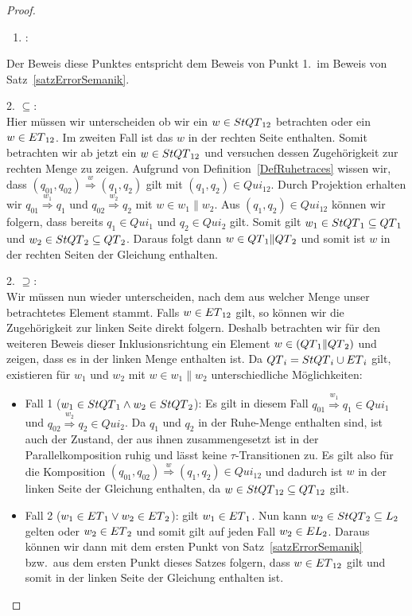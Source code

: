 \begin{proof}
  ~
  \begin{enumerate}
    \item \hspace{-0.2cm}:
  \end{enumerate}
  \vspace{-0.3cm}
  Der Beweis diese Punktes entspricht dem Beweis von Punkt 1.\ im Beweis von
  Satz~\ref{satzErrorSemanik}.

  2. \glqq $\subseteq$\grqq :\\
  Hier müssen wir unterscheiden ob wir ein $w\in StQT{}_{12}$ betrachten oder
  ein $w\in ET{}_{12}$. Im zweiten Fall ist das $w$ in der rechten Seite
  enthalten. Somit betrachten wir ab jetzt ein
  $w\in StQT{}_{12}$ und versuchen dessen Zugehörigkeit zur rechten Menge zu
  zeigen. Aufgrund von Definition~\ref{DefRuhetraces} wissen wir, dass
  $(q_{01},q_{02}) \overset{w}{\Rightarrow} (q_1,q_2)$ gilt mit $(q_1,q_2)\in
  Qui_{12}$. Durch Projektion erhalten wir $q_{01} \overset{w_1}{\Rightarrow}
  q_1$ und $q_{02} \overset{w_2}{\Rightarrow} q_2$ mit $w\in w_1\|w_2$. Aus
  $(q_1,q_2)\in Qui_{12}$ können wir folgern, dass bereits $q_1\in Qui_1$ und
  $q_2\in Qui_2$ gilt. Somit gilt $w_1\in StQT{}_1\subseteq QT{}_1$ und
  $w_2\in StQT{}_2\subseteq QT{}_2$. Daraus folgt dann $w\in
  QT{}_1\|QT{}_2$ und somit ist $w$ in der rechten Seiten der Gleichung
  enthalten.

  2. \glqq $\supseteq$\grqq :\\
  Wir müssen nun wieder unterscheiden, nach dem aus welcher Menge unser
  betrachtetes Element stammt. Falls $w\in ET{}_{12}$ gilt, so können wir die
  Zugehörigkeit zur linken Seite direkt folgern. Deshalb betrachten wir für den
  weiteren Beweis dieser Inklusionsrichtung ein Element $w\in
  (QT{}_1\|QT{}_2)$ und zeigen, dass es in der linken Menge enthalten ist. Da
  $QT{}_i = StQT{}_i\cup ET{}_i$ gilt, existieren für $w_1$ und $w_2$ mit
  $w\in w_1\| w_2$ unterschiedliche Möglichkeiten:
  \begin{itemize}
    \item Fall 1 ($w_1\in StQT{}_1\wedge w_2\in StQT{}_2$): Es gilt in
      diesem Fall $q_{01} \overset{w_1}{\Rightarrow} q_1\in Qui_1$ und $q_{02}
      \overset{w_2}{\Rightarrow} q_2\in Qui_2$. Da $q_1$ und $q_2$ in der
      Ruhe-Menge enthalten sind, ist auch der Zustand, der aus ihnen
      zusammengesetzt ist in der Parallelkomposition ruhig und lässt keine
      $\tau$-Transitionen zu. Es gilt also für die Komposition $(q_{01},q_{02})
      \overset{w}{\Rightarrow} (q_1,q_2)\in Qui_{12}$ und dadurch ist $w$ in
      der linken Seite der Gleichung enthalten, da $w\in StQT{}_{12}\subseteq
      QT{}_{12}$ gilt.
    \item Fall 2 ($w_1\in ET{}_1\vee w_2\in ET{}_2$): \OBdA{} gilt
      $w_1\in ET{}_1$. Nun kann $w_2\in StQT{}_2\subseteq L_2$ gelten
      oder $w_2\in ET{}_2$ und somit gilt auf jeden Fall $w_2\in
      EL{}_2$. Daraus können wir dann mit dem ersten Punkt von
      Satz~\ref{satzErrorSemanik} bzw.\ aus dem ersten Punkt dieses Satzes
      folgern, dass $w\in ET{}_{12}$ gilt und somit in der linken Seite der
      Gleichung enthalten ist.
  \end{itemize}


\end{proof}
